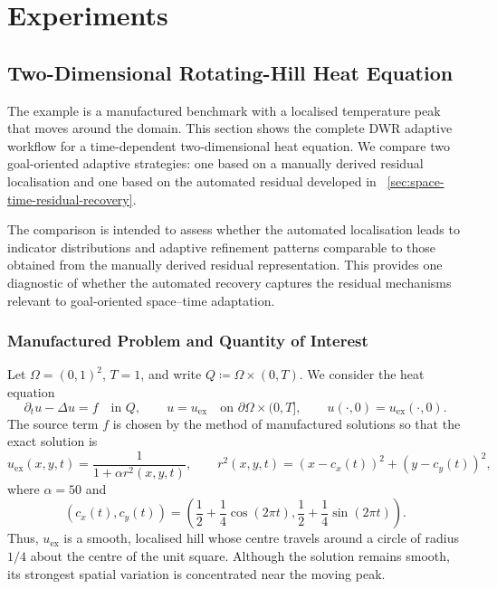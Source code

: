 \chapter{Experiments}
\label{chap:experiments}

\section{Two-Dimensional Rotating-Hill Heat Equation}
\label{sec:moving-hill-dwr}

The example is a manufactured benchmark with a localised temperature peak that moves around the domain. This section shows the complete DWR adaptive workflow for a time-dependent two-dimensional heat equation. We compare two goal-oriented adaptive strategies: one based on a manually derived residual localisation and one based on the automated residual developed in ~\cref{sec:space-time-residual-recovery}.

The comparison is intended to assess whether the automated localisation leads to indicator distributions and adaptive refinement patterns comparable to those obtained from the manually derived residual representation. This provides one diagnostic of whether the automated recovery captures the residual mechanisms relevant to goal-oriented space--time adaptation.


\subsection{Manufactured Problem and Quantity of Interest}
Let $\Omega=(0,1)^2$, $T=1$, and write $Q\coloneqq\Omega\times(0,T)$. We consider the heat equation
\begin{equation}
  \partial_t u-\Delta u=f
  \quad\text{in }Q,
  \qquad
  u=u_{\mathrm{ex}}
  \quad\text{on }\partial\Omega\times(0,T],
  \qquad
  u(\cdot,0)=u_{\mathrm{ex}}(\cdot,0).
  \label{eq:mh-primal}
\end{equation}
The source term $f$ is chosen by the method of manufactured solutions so that the exact solution is
\begin{equation}
  u_{\mathrm{ex}}(x,y,t)
  =
  \frac{1}{1+\alpha r^2(x,y,t)},
  \qquad
  r^2(x,y,t)
  =
  (x-c_x(t))^2+(y-c_y(t))^2,
  \label{eq:mh-exact}
\end{equation}
where $\alpha=50$ and
\begin{equation}
  (c_x(t),c_y(t))
  =
  \left(
    \frac12+\frac14\cos(2\pi t),
    \frac12+\frac14\sin(2\pi t)
  \right).
  \label{eq:mh-centre}
\end{equation}
Thus, $u_{\mathrm{ex}}$ is a smooth, localised hill whose centre travels around a circle of radius $1/4$ about the centre of the unit square. Although the solution remains smooth, its strongest spatial variation is concentrated near the moving peak.

